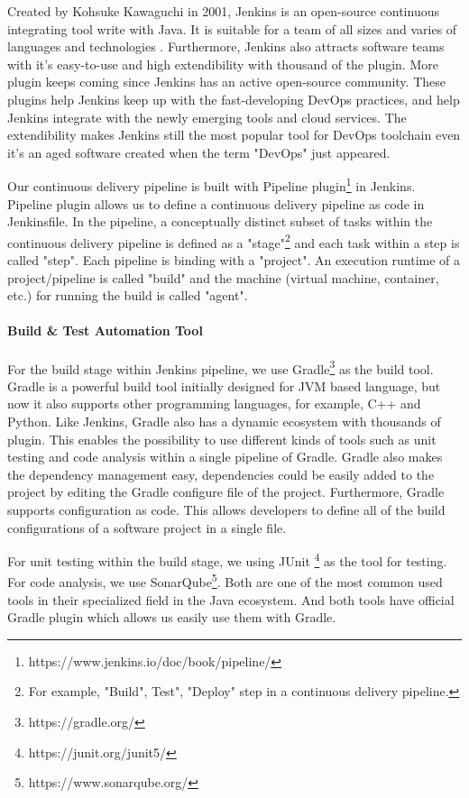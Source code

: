\par
Created by Kohsuke Kawaguchi in 2001, Jenkins is an open-source continuous integrating tool write with Java.  It is suitable for a team of all sizes and varies of languages and technologies \cite{smart2011jenkins}. Furthermore, Jenkins also attracts software teams with it's easy-to-use and high extendibility \cite{smart2011jenkins} with thousand of the plugin. More plugin keeps coming since Jenkins has an active open-source community. These plugins help Jenkins keep up with the fast-developing DevOps practices, and help Jenkins integrate with the newly emerging tools and cloud services. The extendibility makes Jenkins still the most popular tool for DevOps toolchain even it's an aged software created when the term "DevOps" just appeared.
\par
Our continuous delivery pipeline is built with Pipeline plugin\footnote{https://www.jenkins.io/doc/book/pipeline/} in Jenkins. 
Pipeline plugin allows us to define a continuous delivery pipeline as code in Jenkinsfile.
In the pipeline, a conceptually distinct subset of tasks within the continuous delivery pipeline \cite{Pipeline85:online} is defined as a "stage"\footnote{For example, "Build", Test", "Deploy" step in a continuous delivery pipeline.} and each task within a step is called "step". Each pipeline is binding with a "project". An execution runtime of a project/pipeline is called "build" and the machine (virtual machine, container, etc.) for running the build is called "agent".
\paragraph[]{Build \& Test Automation Tool}
For the build stage within Jenkins pipeline, we use Gradle\footnote{https://gradle.org/} as the build tool. 
Gradle is a powerful build tool initially designed for JVM based language, but now it also supports other programming languages, for example, C++ and Python. Like Jenkins, Gradle also has a dynamic ecosystem with thousands of plugin. This enables the possibility to use different kinds of tools such as unit testing and code analysis within a single pipeline of Gradle. Gradle also makes the dependency management easy, dependencies could be easily added to the project by editing the Gradle configure file of the project. Furthermore, Gradle supports configuration as code. This allows developers to define all of the build configurations of a software project in a single file.
\par
For unit testing within the build stage, we using JUnit \footnote{https://junit.org/junit5/} as the tool for testing. For code analysis, we use SonarQube\footnote{https://www.sonarqube.org/}. Both are one of the most common used tools in their specialized field in the Java ecosystem. And both tools have official Gradle plugin which allows us easily use them with Gradle. 
